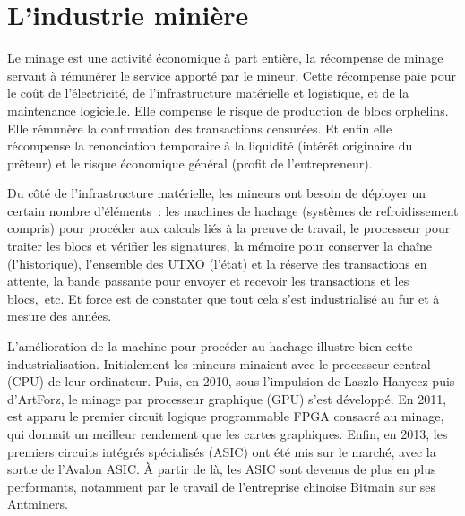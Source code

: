 \section*{L'industrie minière}

Le minage est une activité économique à part entière, la récompense de minage servant à rémunérer le service apporté par le mineur. Cette récompense paie pour le coût de l'électricité, de l'infrastructure matérielle et logistique, et de la maintenance logicielle. Elle compense le risque de production de blocs orphelins. Elle rémunère la confirmation des transactions censurées. Et enfin elle récompense la renonciation temporaire à la liquidité (intérêt originaire du prêteur) et le risque économique général (profit de l'entrepreneur).

Du côté de l'infrastructure matérielle, les mineurs ont besoin de déployer un certain nombre d'éléments~: les machines de hachage (systèmes de refroidissement compris) pour procéder aux calculs liés à la preuve de travail, le processeur pour traiter les blocs et vérifier les signatures, la mémoire pour conserver la chaîne (l'historique), l'ensemble des UTXO (l'état) et la réserve des transactions en attente, la bande passante pour envoyer et recevoir les transactions et les blocs,~etc. Et force est de constater que tout cela s'est industrialisé au fur et à mesure des années.



L'amélioration de la machine pour procéder au hachage illustre bien cette industrialisation. Initialement les mineurs minaient avec le processeur central (CPU) de leur ordinateur. Puis, en 2010, sous l'impulsion de Laszlo Hanyecz puis d'ArtForz, le minage par processeur graphique (GPU) s'est développé. En 2011, est apparu le premier circuit logique programmable FPGA consacré au minage, qui donnait un meilleur rendement que les cartes graphiques. Enfin, en 2013, les premiers circuits intégrés spécialisés (ASIC) ont été mis sur le marché, avec la sortie de l'Avalon ASIC. À partir de là, les ASIC sont devenus de plus en plus performants, notamment par le travail de l'entreprise chinoise Bitmain sur ses Antminers.

